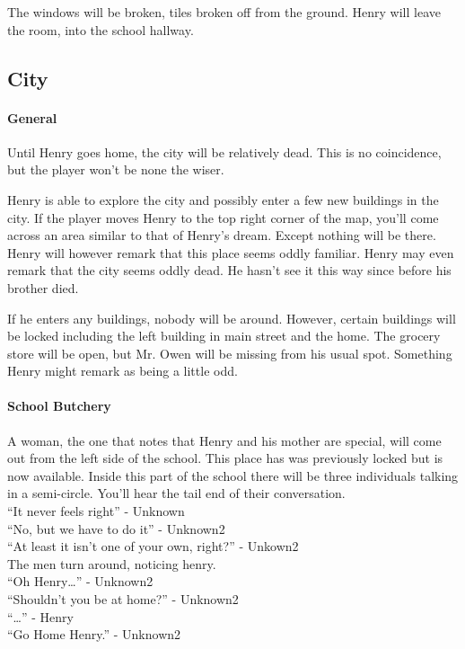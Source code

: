 \documentclass[12pt, a4paper, titlepage]{article}
\begin{document}
            The windows will be broken, tiles broken off from the ground. Henry will leave the room, into the school hallway. 
           
        \subsection{City}

	\paragraph{General}
        Until Henry goes home, the city will be relatively dead. This is no coincidence, but the player won't be none the wiser.
        
        Henry is able to explore the city and possibly enter a few new buildings in the city. If the player moves Henry to the top right corner of the map, you'll come across an area similar
        to that of Henry's dream. Except nothing will be there. Henry will however remark that this place seems oddly familiar. Henry may even remark that the city seems oddly dead. He 
        hasn't see it this way since before his brother died.
        
        If he enters any buildings, nobody will be around. However, certain buildings will be locked including the left building in main street and the home. The grocery store will be open, but 	Mr. 	Owen will be missing from his usual spot. Something Henry might remark as being a little odd.

	\paragraph{School Butchery}
	A woman, the one that notes that Henry and his mother are special, will come out from the left side of the school. This place has was previously locked but is now available. Inside this
	part of the school there will be three individuals talking in a semi-circle. You'll hear the tail end of their conversation.\\

	``It never feels right'' - Unknown\\
	``No, but we have to do it'' - Unknown2\\
	``At least it isn't one of your own, right?''  - Unkown2\\

	The men turn around, noticing henry.\\

	``Oh Henry\ldots'' - Unknown2\\
	``Shouldn't you be at home?'' - Unknown2\\
	``\ldots'' - Henry\\
	``Go Home Henry.'' - Unknown2\\
\end{document}
